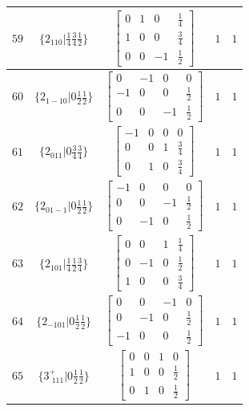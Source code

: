 \documentclass[fleqn,8pt]{jsarticle}
\begin{document}
\begin{longtable}{ccccc}
$ 59 $ & $ \{2{}_{110}|\frac{1}{4} \frac{3}{4} \frac{1}{2}\} $ & $ \begin{bmatrix} 0 & 1 & 0 & \frac{1}{4} \\ 1 & 0 & 0 & \frac{3}{4} \\ 0 & 0 & -1 & \frac{1}{2} \end{bmatrix} $ & $ 1 $ & $ 1 $ \\ \hline
$ 60 $ & $ \{2{}_{1-10}|0 \frac{1}{2} \frac{1}{2}\} $ & $ \begin{bmatrix} 0 & -1 & 0 & 0 \\ -1 & 0 & 0 & \frac{1}{2} \\ 0 & 0 & -1 & \frac{1}{2} \end{bmatrix} $ & $ 1 $ & $ 1 $ \\ \hline
$ 61 $ & $ \{2{}_{011}|0 \frac{3}{4} \frac{3}{4}\} $ & $ \begin{bmatrix} -1 & 0 & 0 & 0 \\ 0 & 0 & 1 & \frac{3}{4} \\ 0 & 1 & 0 & \frac{3}{4} \end{bmatrix} $ & $ 1 $ & $ 1 $ \\ \hline
$ 62 $ & $ \{2{}_{01-1}|0 \frac{1}{2} \frac{1}{2}\} $ & $ \begin{bmatrix} -1 & 0 & 0 & 0 \\ 0 & 0 & -1 & \frac{1}{2} \\ 0 & -1 & 0 & \frac{1}{2} \end{bmatrix} $ & $ 1 $ & $ 1 $ \\ \hline
$ 63 $ & $ \{2{}_{101}|\frac{1}{4} \frac{1}{2} \frac{3}{4}\} $ & $ \begin{bmatrix} 0 & 0 & 1 & \frac{1}{4} \\ 0 & -1 & 0 & \frac{1}{2} \\ 1 & 0 & 0 & \frac{3}{4} \end{bmatrix} $ & $ 1 $ & $ 1 $ \\ \hline
$ 64 $ & $ \{2{}_{-101}|0 \frac{1}{2} \frac{1}{2}\} $ & $ \begin{bmatrix} 0 & 0 & -1 & 0 \\ 0 & -1 & 0 & \frac{1}{2} \\ -1 & 0 & 0 & \frac{1}{2} \end{bmatrix} $ & $ 1 $ & $ 1 $ \\ \hline
$ 65 $ & $ \{3^{+}_{\,\,111}|0 \frac{1}{2} \frac{1}{2}\} $ & $ \begin{bmatrix} 0 & 0 & 1 & 0 \\ 1 & 0 & 0 & \frac{1}{2} \\ 0 & 1 & 0 & \frac{1}{2} \end{bmatrix} $ & $ 1 $ & $ 1 $ \\ \hline

\end{longtable}
\end{document}
